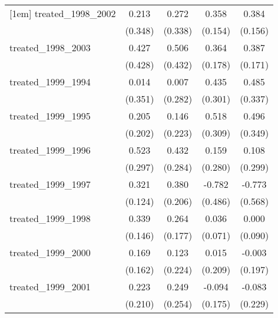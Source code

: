 {\begin{tabular}{l*{4}{c}}
[1em]
treated\_1998\_2002&       0.213         &       0.272         &       0.358\sym{*}  &       0.384\sym{*}  \\
            &     (0.348)         &     (0.338)         &     (0.154)         &     (0.156)         \\
[1em]
treated\_1998\_2003&       0.427         &       0.506         &       0.364\sym{*}  &       0.387\sym{*}  \\
            &     (0.428)         &     (0.432)         &     (0.178)         &     (0.171)         \\
[1em]
treated\_1999\_1994&       0.014         &       0.007         &       0.435         &       0.485         \\
            &     (0.351)         &     (0.282)         &     (0.301)         &     (0.337)         \\
[1em]
treated\_1999\_1995&       0.205         &       0.146         &       0.518         &       0.496         \\
            &     (0.202)         &     (0.223)         &     (0.309)         &     (0.349)         \\
[1em]
treated\_1999\_1996&       0.523         &       0.432         &       0.159         &       0.108         \\
            &     (0.297)         &     (0.284)         &     (0.280)         &     (0.299)         \\
[1em]
treated\_1999\_1997&       0.321\sym{**} &       0.380         &      -0.782         &      -0.773         \\
            &     (0.124)         &     (0.206)         &     (0.486)         &     (0.568)         \\
[1em]
treated\_1999\_1998&       0.339\sym{*}  &       0.264         &       0.036         &       0.000         \\
            &     (0.146)         &     (0.177)         &     (0.071)         &     (0.090)         \\
[1em]
treated\_1999\_2000&       0.169         &       0.123         &       0.015         &      -0.003         \\
            &     (0.162)         &     (0.224)         &     (0.209)         &     (0.197)         \\
[1em]
treated\_1999\_2001&       0.223         &       0.249         &      -0.094         &      -0.083         \\
            &     (0.210)         &     (0.254)         &     (0.175)         &     (0.229)         \\

\end{tabular}}

